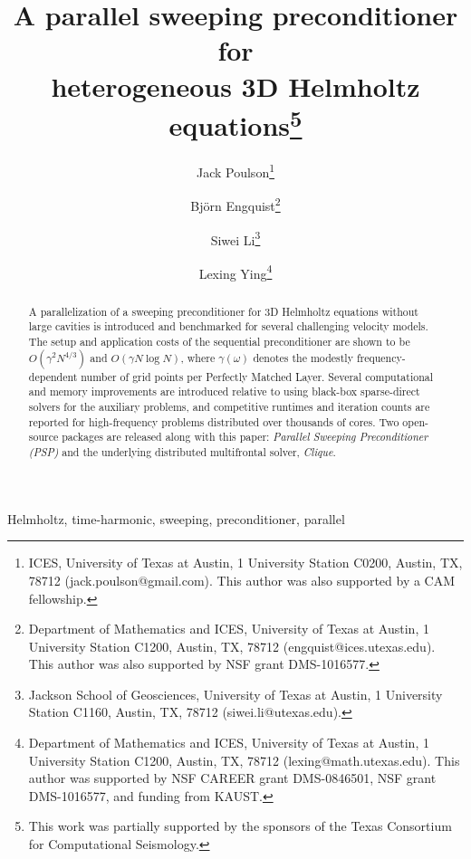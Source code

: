 \title{A parallel sweeping preconditioner for\\ 
       heterogeneous 3D Helmholtz equations\thanks{This work was partially 
       supported by the sponsors of the Texas Consortium for Computational 
       Seismology.}}

\author{Jack Poulson\thanks{ICES,
        University of Texas at Austin, 1 University Station C0200, 
        Austin, TX, 78712 (jack.poulson@gmail.com). This author was also 
        supported by a CAM fellowship.} \and 
        Bj\"orn Engquist\thanks{Department of Mathematics and ICES,
        University of Texas at Austin, 1 University Station C1200,
        Austin, TX, 78712 (engquist@ices.utexas.edu). This author was also 
        supported by NSF grant DMS-1016577.} \and 
        Siwei Li\thanks{Jackson School of Geosciences,
        University of Texas at Austin, 1 University Station C1160,
        Austin, TX, 78712 (siwei.li@utexas.edu).} \and
        Lexing Ying\thanks{Department of Mathematics and ICES, 
        University of Texas at Austin, 1 University Station C1200,
        Austin, TX, 78712 (lexing@math.utexas.edu). This author was supported 
        by NSF CAREER grant DMS-0846501, NSF grant DMS-1016577, and 
        funding from KAUST.}}

\maketitle

\begin{abstract}
A parallelization of a sweeping preconditioner for 3D Helmholtz equations 
without large cavities is introduced and benchmarked for several 
challenging velocity models. 
The setup and application costs of the
sequential preconditioner are shown to be $O(\gamma^2 N^{4/3})$ 
and $O(\gamma N \log N)$, where $\gamma(\omega)$ denotes the modestly 
frequency-dependent number of grid points per Perfectly Matched Layer. 
Several computational and memory improvements are introduced relative to 
using black-box sparse-direct solvers for the auxiliary problems, and 
competitive runtimes and iteration counts are reported for high-frequency 
problems distributed over thousands of cores.
Two open-source packages are released along with this paper: {\em Parallel 
Sweeping Preconditioner (PSP)} and the underlying distributed multifrontal 
solver, {\em Clique}.
\end{abstract}

\begin{keywords} 
Helmholtz, time-harmonic, sweeping, preconditioner, parallel
\end{keywords}


